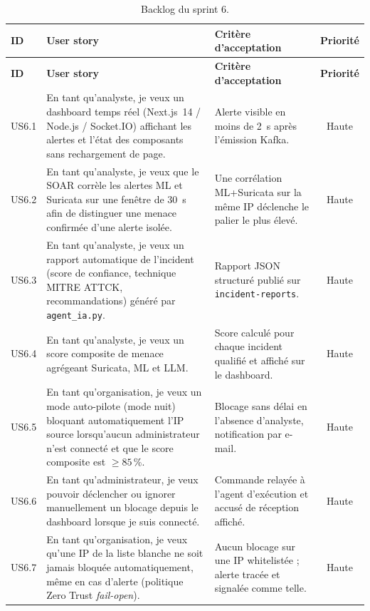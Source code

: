 \renewcommand{\arraystretch}{1.25}
\small
\begin{xltabular}{\textwidth}{|l|>{\raggedright\arraybackslash}X|>{\raggedright\arraybackslash}X|c|}

\caption{Backlog du sprint 6.}
\label{tab:backlog-s6} \\

\hline
{}
\textbf{ID} & \textbf{User story} & \textbf{Critère d'acceptation} & \textbf{Priorité} \\ \hline
\endfirsthead

\hline
{}
\textbf{ID} & \textbf{User story} & \textbf{Critère d'acceptation} & \textbf{Priorité} \\ \hline
\endhead

US6.1 & En tant qu'analyste, je veux un dashboard temps réel (Next.js~14 / Node.js / Socket.IO) affichant les alertes et l'état des composants sans rechargement de page. & Alerte visible en moins de 2~s après l'émission Kafka. & Haute \\ \hline
US6.2 & En tant qu'analyste, je veux que le \ac{SOAR} corrèle les alertes ML et Suricata sur une fenêtre de 30~s afin de distinguer une menace confirmée d'une alerte isolée. & Une corrélation ML+Suricata sur la même IP déclenche le palier le plus élevé. & Haute \\ \hline
US6.3 & En tant qu'analyste, je veux un rapport automatique de l'incident (score de confiance, technique \ac{MITRE} \ac{ATTCK}, recommandations) généré par \texttt{agent\_ia.py}. & Rapport JSON structuré publié sur \texttt{incident-reports}. & Haute \\ \hline
US6.4 & En tant qu'analyste, je veux un score composite de menace agrégeant Suricata, ML et LLM. & Score calculé pour chaque incident qualifié et affiché sur le dashboard. & Haute \\ \hline
US6.5 & En tant qu'organisation, je veux un mode auto-pilote (mode nuit) bloquant automatiquement l'IP source lorsqu'aucun administrateur n'est connecté et que le score composite est $\ge 85\,\%$. & Blocage sans délai en l'absence d'analyste, notification par e-mail. & Haute \\ \hline
US6.6 & En tant qu'administrateur, je veux pouvoir déclencher ou ignorer manuellement un blocage depuis le dashboard lorsque je suis connecté. & Commande relayée à l'agent d'exécution et accusé de réception affiché. & Haute \\ \hline
US6.7 & En tant qu'organisation, je veux qu'une IP de la liste blanche ne soit jamais bloquée automatiquement, même en cas d'alerte (politique Zero Trust \emph{fail-open}). & Aucun blocage sur une IP whitelistée ; alerte tracée et signalée comme telle. & Haute \\ \hline

\end{xltabular}
